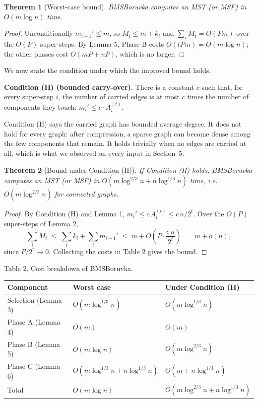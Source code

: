 \documentclass[11pt]{article}
\theoremstyle{plain}
\newtheorem{theorem}{Theorem}
\theoremstyle{remark}
\begin{document}
\begin{theorem}[Worst-case bound]
BMSBoruvka computes an MST (or MSF) in \(O(m\log n)\) time.
\end{theorem}

\begin{proof}
Unconditionally \(m_{i-1}' \le m\), so \(M_i \le m + k_i\) and
\(\sum_i M_i = O(Pm)\) over the \(O(P)\) super-steps. By Lemma 5,
Phase B costs \(O(tPm) = O(m\log n)\); the other phases cost
\(O(mP + nP)\), which is no larger.
\end{proof}

We now state the condition under which the improved bound holds.

\medskip
\noindent\textbf{Condition (H) (bounded carry-over).} There is a
constant \(c\) such that, for every super-step \(i\), the number of
carried edges is at most \(c\) times the number of components they
touch: \(m_i' \le c \cdot A_i^{(t)}\).
\medskip

Condition (H) says the carried graph has bounded average degree. It
does not hold for every graph: after compression, a sparse graph can
become dense among the few components that remain. It holds trivially
when no edges are carried at all, which is what we observed on every
input in Section~5.

\begin{theorem}[Bound under Condition (H)]
If Condition (H) holds, BMSBoruvka computes an MST (or MSF) in
\(O(m\log^{2/3} n + n\log^{1/3} n)\) time, i.e.
\(O(m\log^{2/3} n)\) for connected graphs.
\end{theorem}

\begin{proof}
By Condition (H) and Lemma 1, \(m_i' \le c\,A_i^{(t)} \le c\,n/2^{t}\).
Over the \(O(P)\) super-steps of Lemma 2,
\[
\sum_i M_i \;\le\; \sum_i k_i + \sum_i m_{i-1}'
\;\le\; m + O\!\left(P\cdot \frac{c\,n}{2^{t}}\right)
\;=\; m + o(n),
\]
since \(P/2^{t} \to 0\). Collecting the costs in Table 2 gives the
bound.
\end{proof}

Table 2. Cost breakdown of BMSBoruvka.

\begin{longtable}[]{@{}lll@{}}
\toprule
Component & Worst case & Under Condition (H) \\
\midrule
\endhead
\bottomrule
\endlastfoot
Selection (Lemma 3) & \(O(m\log^{1/3} n)\) & \(O(m\log^{1/3} n)\) \\
Phase A (Lemma 4) & \(O(m)\) & \(O(m)\) \\
Phase B (Lemma 5) & \(O(m\log n)\) & \(O(m\log^{2/3} n)\) \\
Phase C (Lemma 6) & \(O(m\log^{1/3} n + n\log^{1/3} n)\) & \(O(m + n\log^{1/3} n)\) \\
Total & \(O(m\log n)\) & \(O(m\log^{2/3} n + n\log^{1/3} n)\) \\
\end{longtable}
\end{document}
